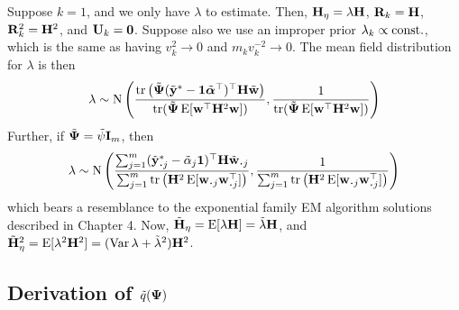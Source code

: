 \begin{example}
  Suppose $k=1$, and we only have $\lambda$ to estimate.
  Then, ${\mathbf H}_\eta = \lambda {\mathbf H}$, ${\mathbf R}_k = {\mathbf H}$, ${\mathbf R}_k^2 = {\mathbf H}^2$, and ${\mathbf U}_k = {\mathbf 0}$.
  Suppose also we use an improper prior $\lambda_k \propto \text{const.}\hspace{0.01em}$, which is the same as having $v_k^2 \to 0$ and $m_k v_k^{-2} \to 0$.
  The mean field distribution for $\lambda$ is then
  \[
    \lambda \sim \operatorname{N} \left( 
    \frac{\operatorname{tr}\big(\tilde{{\bm\Psi}}(\tilde{{\mathbf y}}^* - {\mathbf 1}\tilde{{\bm\alpha}}^\top)^\top {\mathbf H} \tilde{{\mathbf w}} \big)}{\operatorname{tr}(\tilde{{\bm\Psi}}\operatorname{E}[{\mathbf w}^\top{\mathbf H}^2{\mathbf w}])},
    \frac{1}{\operatorname{tr}(\tilde{{\bm\Psi}}\operatorname{E}[{\mathbf w}^\top{\mathbf H}^2{\mathbf w}])}
    \right)
  \]
  Further, if $\tilde{{\bm\Psi}} = \tilde\psi{\mathbf I}_m$, then
  \[
    \lambda \sim \N \left( 
    \frac{\sum_{j=1}^m (\tilde\by^*_{\bigcdot j} - \tilde\alpha_j\bone)^\top \bH \tilde\bw_{\bigcdot j} }{\sum_{j=1}^m
  \tr \big( \bH^2 \E [\bw_{\bigcdot j} \bw_{\bigcdot j}^\top] \big)},
    \frac{1}{\sum_{j=1}^m
  \tr \big( \bH^2 \E [\bw_{\bigcdot j} \bw_{\bigcdot j}^\top] \big)}
    \right)
  \]
  which bears a resemblance to the exponential family EM algorithm solutions described in Chapter 4.
  Now, $\tilde {{\mathbf H}}_\eta = \operatorname{E}[\lambda {\mathbf H}] = \tilde\lambda {\mathbf H}$, and $\tilde {{\mathbf H}}_\eta^2 = \operatorname{E}[\lambda^2 {\mathbf H}^2] = (\operatorname{Var}\lambda + \tilde\lambda^2) {\mathbf H}^2$.
\end{example}

\subsection{Derivation of \texorpdfstring{$\tilde q({\bm\Psi})$}{$\tilde q(\Psi)$}}


